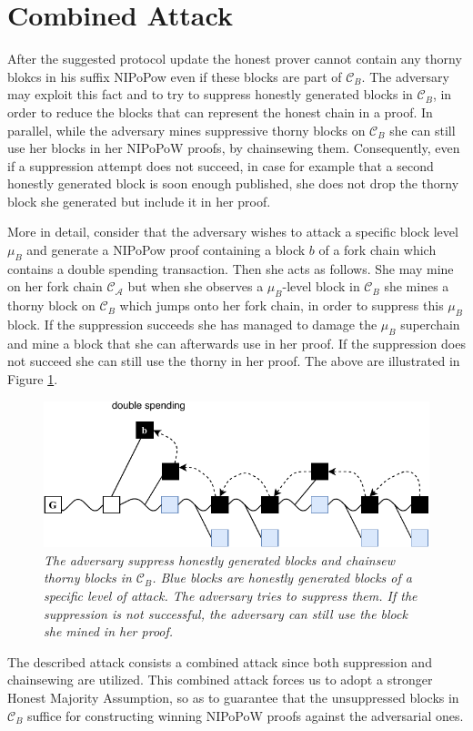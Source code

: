 \section{Combined Attack}
After the suggested protocol update the honest prover cannot contain any thorny blokcs in his suffix NIPoPow even if these blocks are part of $\mathcal{C}_B$.  The adversary may exploit this fact and to try to suppress honestly generated blocks in $\mathcal{C}_B$, in order to reduce the blocks that can represent the honest chain in a proof. In parallel, while the adversary mines suppressive thorny blocks on $\mathcal{C}_B$ she can still use her blocks in her NIPoPoW proofs, by chainsewing them. Consequently, even if a suppression attempt does not succeed, in case for example that a second honestly generated block is soon enough published, she does not drop the thorny block she generated but include it in her proof.

More in detail, consider that the adversary wishes to attack a specific block level $\mu_B$ and generate a NIPoPow proof containing a block $b$ of a fork chain which contains a double spending transaction. Then she acts as follows. She may mine on her fork chain $\mathcal{C}_\mathcal{A}$ but when she observes a $\mu_B$-level block in $\mathcal{C}_B$ she mines a thorny block on $\mathcal{C}_B$ which jumps onto her fork chain, in order to suppress this $\mu_B$ block. If the suppression succeeds she has managed to damage the $\mu_B$ superchain and mine a block that she can afterwards use in her proof. If the suppression does not succeed she can still use the thorny in her proof. The above are illustrated in Figure \ref{fig:attack_after_update}.

\begin{figure}[h!]
	\begin{center}
    \includegraphics[scale=0.65]{figures/attack_after_update-crop.pdf}
	\end{center}
	\caption{\textit{The adversary suppress honestly generated blocks and chainsew thorny blocks in $\mathcal{C}_B$. Blue blocks are honestly generated blocks of a specific level of attack. The adversary tries to suppress them. If the suppression is not successful, the adversary can still use the block she mined in her proof.}}
	\label{fig:attack_after_update}
\end{figure}

The described attack consists a combined attack since both suppression and chainsewing are utilized. This combined attack forces us to adopt a stronger Honest Majority Assumption, so as to guarantee that the unsuppressed blocks in $\mathcal{C}_B$ suffice for constructing winning NIPoPoW proofs against the adversarial ones.
